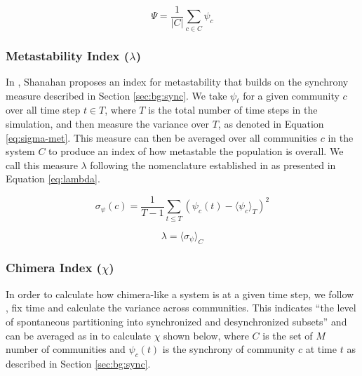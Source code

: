 \documentclass[a4paper,11pt]{article}
\begin{document}
\begin{equation} \label{eq:global-sync}
\Psi = \frac{1}{|C|} \sum_{c \in C} \widehat{\psi}_c
\end{equation}
 
\subsubsection{Metastability Index ($\lambda$)}
\label{sec:bg:lambda}

In \cite{Shanahan2010}, Shanahan proposes an index for metastability that builds on the synchrony measure described in Section \ref{sec:bg:sync}. We take $\psi_t$ for a given community $c$ over all time step $t \in T$, where $T$ is the total number of time steps in the simulation, and then measure the variance over $T$, as denoted in Equation \ref{eq:sigma-met}. This measure can then be averaged over all communities $c$ in the system $C$ to produce an index of how metastable the population is overall. We call this measure $\lambda$ following the nomenclature established in \cite{Shanahan2010} as presented in Equation \ref{eq:lambda}.

\begin{equation} \label{eq:sigma-met}
\sigma_{\psi}(c) = \frac{1}{T - 1} \sum_{t \leq T }(\psi_{c}(t) - \langle \psi_{c}\rangle_T)^2
\end{equation}

\begin{equation} \label{eq:lambda}
\lambda = \langle \sigma_{\psi} \rangle_C
\end{equation}

\subsubsection{Chimera Index ($\chi$)}
\label{sec:bg:chi}

In order to calculate how chimera-like a system is at a given time step, we follow \cite{Shanahan2010, Bhowmik2013}, fix time and calculate the variance across communities. This indicates ``the level of spontaneous partitioning into synchronized and desynchronized subsets'' \cite{Bhowmik2013} and can be averaged as in \cite{Shanahan2010} to calculate $\chi$ shown below, where $C$ is the set of $M$ number of communities and $\psi_c(t)$ is the synchrony of community $c$ at time $t$ as described in Section \ref{sec:bg:sync}.
\end{document}
